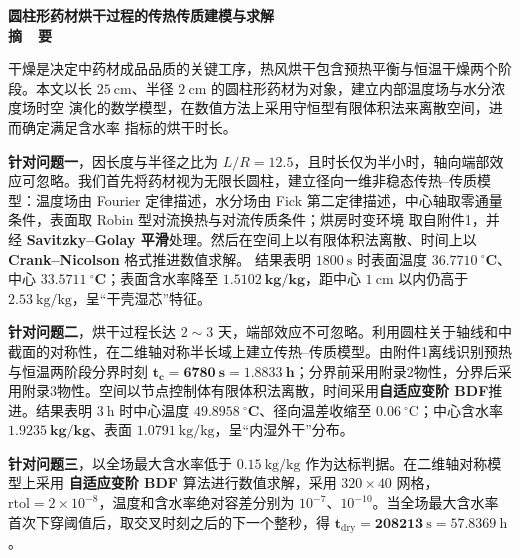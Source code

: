 \documentclass[12pt,a4paper]{ctexart}
\begin{document}
\setcounter{page}{1}
\thispagestyle{fancy}

\begin{center}
{\LARGE\bfseries 圆柱形药材烘干过程的传热传质建模与求解}\\[1.5em]
{\large\bfseries 摘~~要}\\[0.8em]
\end{center}

干燥是决定中药材成品品质的关键工序，热风烘干包含预热平衡与恒温干燥两个阶段。本文以长
$25\ \mathrm{cm}$、半径 $2\ \mathrm{cm}$ 的圆柱形药材为对象，建立内部温度场与水分浓度场时空
演化的数学模型，在数值方法上采用守恒型有限体积法来离散空间，进而确定满足含水率
指标的烘干时长。

\textbf{针对问题一}，因长度与半径之比为 $L/R=12.5$，且时长仅为半小时，轴向端部效应可忽略。我们首先将药材视为无限长圆柱，建立径向一维非稳态传热--传质模型：温度场由 Fourier 定律描述，水分场由
Fick 第二定律描述，中心轴取零通量条件，表面取 Robin 型对流换热与对流传质条件；烘房时变环境
取自附件1，并经 \textbf{Savitzky--Golay 平滑}处理。然后在空间上以有限体积法离散、时间上以 \textbf{Crank--Nicolson} 格式推进数值求解。
结果表明 $1800\ \mathrm{s}$ 时表面温度 $\mathbf{36.7710\ ^\circ C}$、中心
$\mathbf{33.5711\ ^\circ C}$；表面含水率降至 $\mathbf{1.5102\ kg/kg}$，距中心
$1\ \mathrm{cm}$ 以内仍高于 $2.53\ \mathrm{kg/kg}$，呈“干壳湿芯”特征。

\textbf{针对问题二}，烘干过程长达 $2\sim3$ 天，端部效应不可忽略。利用圆柱关于轴线和中截面的对称性，在二维轴对称半长域上建立传热--传质模型。由附件1离线识别预热与恒温两阶段分界时刻 $\mathbf{t_c=6780\ s=1.8833\ h}$；分界前采用附录2物性，分界后采用附录3物性。空间以节点控制体有限体积法离散，时间采用\textbf{自适应变阶 BDF}推进。结果表明
$3\ \mathrm{h}$ 时中心温度 $\mathbf{49.8958\ ^\circ C}$、径向温差收缩至
$0.06\ ^\circ\mathrm{C}$；中心含水率 $\mathbf{1.9235\ kg/kg}$、表面
$1.0791\ \mathrm{kg/kg}$，呈“内湿外干”分布。

\textbf{针对问题三}，以全场最大含水率低于 $0.15\ \mathrm{kg/kg}$ 作为达标判据。在二维轴对称模型上采用
\textbf{自适应变阶 BDF} 算法进行数值求解，采用 $320\times40$ 网格，$\mathrm{rtol}=2\times10^{-8}$，温度和含水率绝对容差分别为 $10^{-7}$、$10^{-10}$。当全场最大含水率首次下穿阈值后，取交叉时刻之后的下一个整秒，得
$\mathbf{t_{\mathrm{dry}}=208213\ \mathrm{s}=57.8369\ \mathrm{h}}$。
\end{document}
